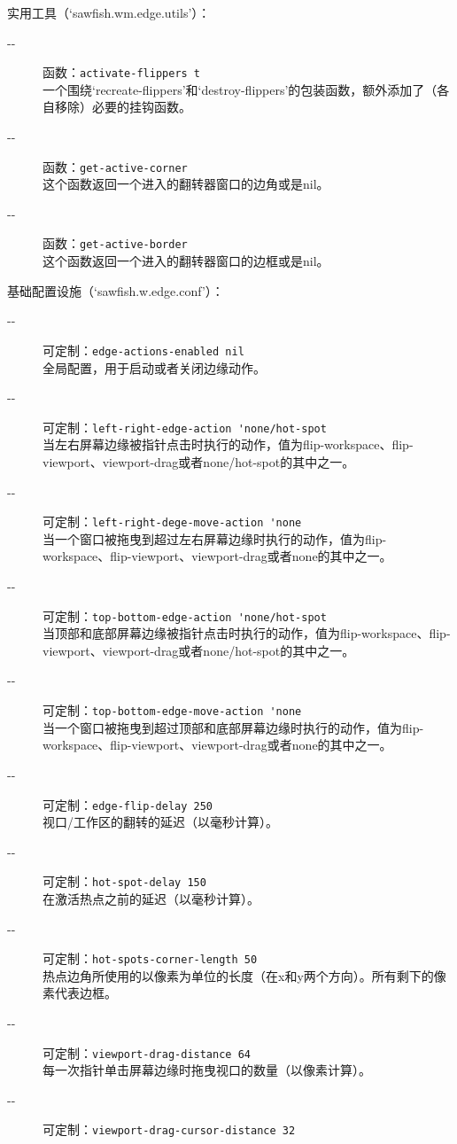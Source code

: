\documentclass{book}
\begin{document}
\begin{CJK*}{UTF8}{gbsn}
实用工具（`sawfish.wm.edge.utils'）：
\begin{description}
\item[-{}-] 函数：\verb|activate-flippers t|\\
一个围绕`recreate-flippers'和`destroy-flippers'的包装函数，额外添加了（各自移除）必要的挂钩函数。
\item[-{}-] 函数：\verb|get-active-corner|\\
这个函数返回一个进入的翻转器窗口的边角或是nil。
\item[-{}-] 函数：\verb|get-active-border|\\
这个函数返回一个进入的翻转器窗口的边框或是nil。
\end{description}

基础配置设施（`sawfish.w.edge.conf'）：
\begin{description}
\item[-{}-] 可定制：\verb|edge-actions-enabled nil|\\
全局配置，用于启动或者关闭边缘动作。
\item[-{}-] 可定制：\verb|left-right-edge-action 'none/hot-spot|\\
当左右屏幕边缘被指针点击时执行的动作，值为flip-workspace、flip-viewport、viewport-drag或者none/hot-spot的其中之一。
\item[-{}-] 可定制：\verb|left-right-dege-move-action 'none|\\
当一个窗口被拖曳到超过左右屏幕边缘时执行的动作，值为flip-workspace、flip-viewport、viewport-drag或者none的其中之一。
\item[-{}-] 可定制：\verb|top-bottom-edge-action 'none/hot-spot|\\
当顶部和底部屏幕边缘被指针点击时执行的动作，值为flip-workspace、flip-viewport、viewport-drag或者none/hot-spot的其中之一。
\item[-{}-] 可定制：\verb|top-bottom-edge-move-action 'none|\\
当一个窗口被拖曳到超过顶部和底部屏幕边缘时执行的动作，值为flip-workspace、flip-viewport、viewport-drag或者none的其中之一。
\item[-{}-] 可定制：\verb|edge-flip-delay 250|\\
视口/工作区的翻转的延迟（以毫秒计算）。
\item[-{}-] 可定制：\verb|hot-spot-delay 150|\\
在激活热点之前的延迟（以毫秒计算）。
\item[-{}-] 可定制：\verb|hot-spots-corner-length 50|\\
热点边角所使用的以像素为单位的长度（在x和y两个方向）。所有剩下的像素代表边框。
\item[-{}-] 可定制：\verb|viewport-drag-distance 64|\\
每一次指针单击屏幕边缘时拖曳视口的数量（以像素计算）。
\item[-{}-] 可定制：\verb|viewport-drag-cursor-distance 32|\\


\end{description}
\end{CJK*}
\end{document}
